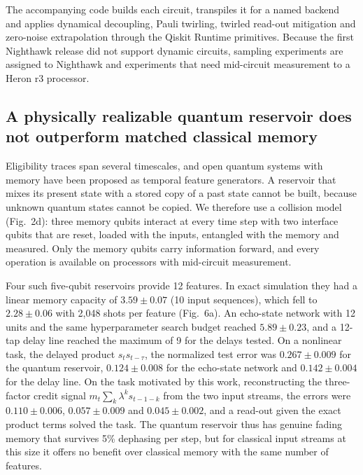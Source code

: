 The accompanying code builds each circuit, transpiles it for a named backend and applies dynamical decoupling\cite{viola1999}, Pauli twirling\cite{wallman2016}, twirled read-out mitigation and zero-noise extrapolation through the Qiskit Runtime primitives\cite{qiskit2024}. Because the first Nighthawk release did not support dynamic circuits\cite{ibm2026}, sampling experiments are assigned to Nighthawk and experiments that need mid-circuit measurement to a Heron r3 processor. 

\subsection*{A physically realizable quantum reservoir does not outperform matched classical memory}

Eligibility traces span several timescales, and open quantum systems with memory have been proposed as temporal feature generators\cite{fujii2017,sannia2026}. A reservoir that mixes its present state with a stored copy of a past state cannot be built, because unknown quantum states cannot be copied. We therefore use a collision model\cite{ciccarello2022} (Fig.~2d): three memory qubits interact at every time step with two interface qubits that are reset, loaded with the inputs, entangled with the memory and measured\cite{mujal2023}. Only the memory qubits carry information forward, and every operation is available on processors with mid-circuit measurement.

Four such five-qubit reservoirs provide 12 features. In exact simulation they had a linear memory capacity of $3.59\pm0.07$ (10 input sequences), which fell to $2.28\pm0.06$ with 2,048 shots per feature (Fig.~6a). An echo-state network\cite{jaeger2004} with 12 units and the same hyperparameter search budget reached $5.89\pm0.23$, and a 12-tap delay line reached the maximum of 9 for the delays tested. On a nonlinear task, the delayed product $s_{t}s_{t-\tau}$, the normalized test error was $0.267\pm0.009$ for the quantum reservoir, $0.124\pm0.008$ for the echo-state network and $0.142\pm0.004$ for the delay line. On the task motivated by this work, reconstructing the three-factor credit signal $m_{t}\sum_{k}\lambda^{k}s_{t-1-k}$ from the two input streams, the errors were $0.110\pm0.006$, $0.057\pm0.009$ and $0.045\pm0.002$, and a read-out given the exact product terms solved the task. The quantum reservoir thus has genuine fading memory that survives 5\% dephasing per step, but for classical input streams at this size it offers no benefit over classical memory with the same number of features.

